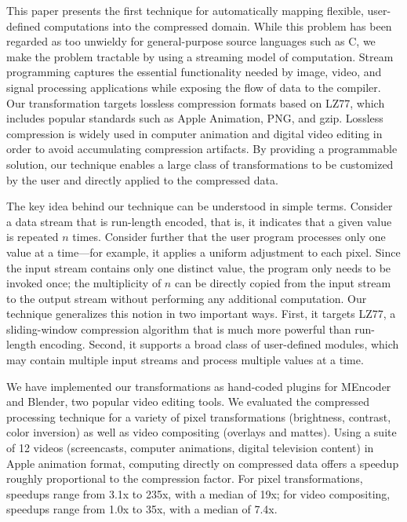 This paper presents the first technique for automatically mapping
flexible, user-defined computations into the compressed domain.  While
this problem has been regarded as too unwieldy for general-purpose
source languages such as C, we make the problem tractable by using a
streaming model of computation.  Stream programming captures the
essential functionality needed by image, video, and signal processing
applications while exposing the flow of data to the compiler.  Our
transformation targets lossless compression formats based on LZ77,
which includes popular standards such as Apple Animation, PNG, and
gzip.  Lossless compression is widely used in computer animation and
digital video editing in order to avoid accumulating compression
artifacts.  By providing a programmable solution, our technique
enables a large class of transformations to be customized by the user
and directly applied to the compressed data.

The key idea behind our technique can be understood in simple terms.
Consider a data stream that is run-length encoded, that is, it
indicates that a given value is repeated $n$ times.  Consider further
that the user program processes only one value at a time---for
example, it applies a uniform adjustment to each pixel.  Since the
input stream contains only one distinct value, the program only needs
to be invoked once; the multiplicity of $n$ can be directly copied
from the input stream to the output stream without performing any
additional computation.  Our technique generalizes this notion in two
important ways.  First, it targets LZ77, a sliding-window compression
algorithm that is much more powerful than run-length encoding.
Second, it supports a broad class of user-defined modules, which may
contain multiple input streams and process multiple values at a time.

We have implemented our transformations as hand-coded plugins for
MEncoder and Blender, two popular video editing tools.  We evaluated
the compressed processing technique for a variety of pixel
transformations (brightness, contrast, color inversion) as well as
video compositing (overlays and mattes).  Using a suite of 12 videos
(screencasts, computer animations, digital television content) in
Apple animation format, computing directly on compressed data offers a
speedup roughly proportional to the compression factor.  For pixel
transformations, speedups range from 3.1x to 235x, with a median of
19x; for video compositing, speedups range from 1.0x to 35x, with a
median of 7.4x.

